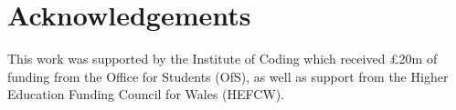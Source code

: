 \documentclass[sigconf,anonymous]{acmart}
\begin{document}

\section*{Acknowledgements}

This work was supported by the Institute of Coding which received
\pounds20m of funding from the Office for Students (OfS), as well as
support from the Higher Education Funding Council for Wales (HEFCW).
\ifanon
\fi


 
\end{document}
